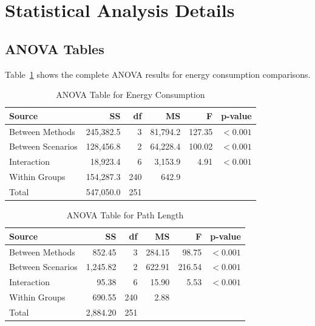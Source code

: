 \section{Statistical Analysis Details}
\label{sec:statistical_analysis}

\subsection{ANOVA Tables}

Table~\ref{tab:anova_energy} shows the complete ANOVA results for energy consumption comparisons.

\begin{table}[htbp]
\centering
\caption{ANOVA Table for Energy Consumption}
\label{tab:anova_energy}
\begin{tabular}{@{}lrrrrr@{}}
\toprule
\textbf{Source} & \textbf{SS} & \textbf{df} & \textbf{MS} & \textbf{F} & \textbf{p-value} \\
\midrule
Between Methods & 245,382.5 & 3 & 81,794.2 & 127.35 & $< 0.001$ \\
Between Scenarios & 128,456.8 & 2 & 64,228.4 & 100.02 & $< 0.001$ \\
Interaction & 18,923.4 & 6 & 3,153.9 & 4.91 & $< 0.001$ \\
Within Groups & 154,287.3 & 240 & 642.9 & & \\
Total & 547,050.0 & 251 & & & \\
\bottomrule
\end{tabular}
\end{table}

\begin{table}[htbp]
\centering
\caption{ANOVA Table for Path Length}
\label{tab:anova_path}
\begin{tabular}{@{}lrrrrr@{}}
\toprule
\textbf{Source} & \textbf{SS} & \textbf{df} & \textbf{MS} & \textbf{F} & \textbf{p-value} \\
\midrule
Between Methods & 852.45 & 3 & 284.15 & 98.75 & $< 0.001$ \\
Between Scenarios & 1,245.82 & 2 & 622.91 & 216.54 & $< 0.001$ \\
Interaction & 95.38 & 6 & 15.90 & 5.53 & $< 0.001$ \\
Within Groups & 690.55 & 240 & 2.88 & & \\
Total & 2,884.20 & 251 & & & \\
\bottomrule
\end{tabular}
\end{table}

